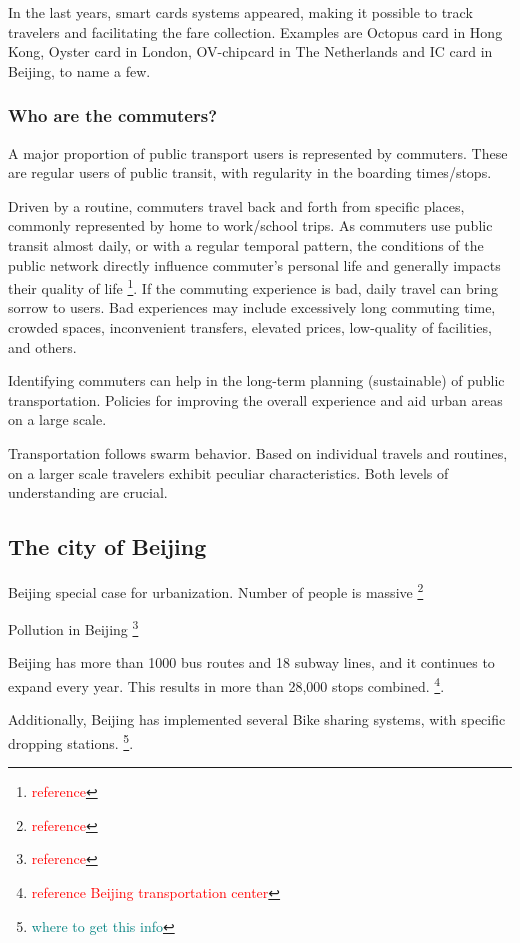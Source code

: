\documentclass{article}
\newcommand{\selfnote}[1]{\footnote{\textcolor{red}{#1}}}
\newcommand{\domainDoubt}[1]{\footnote{\textcolor{teal}{#1}}}
\begin{document}
In the last years, smart cards systems appeared, making it possible to track travelers and facilitating the fare collection. Examples are Octopus card in Hong Kong, Oyster card in London, OV-chipcard in The Netherlands and IC card in Beijing, to name a few.


\subsubsection{Who are the commuters?}
A major proportion of public transport users is represented by commuters. These are regular users of public transit, with regularity in the boarding times/stops. 

Driven by a routine, commuters travel back and forth from specific places, commonly represented by home to work/school trips. As commuters use public transit almost daily, or with a regular temporal pattern, the  conditions of the public network directly influence commuter's personal life and generally impacts their quality of life \selfnote{reference}. If the commuting experience is bad, daily travel can bring sorrow to users. Bad experiences may include excessively long commuting time, crowded spaces, inconvenient transfers, elevated prices, low-quality of facilities, and others. 

Identifying commuters can help in the long-term planning (sustainable) of public transportation. Policies for improving the overall experience and aid urban areas on a large scale.

Transportation follows swarm behavior. Based on individual travels and routines, on a larger scale travelers exhibit peculiar characteristics. Both levels of understanding are crucial.   

\subsection{The city of Beijing}
Beijing special case for urbanization. Number of people is massive \selfnote{reference}

Pollution in Beijing \selfnote{reference}

Beijing has more than 1000 bus routes and 18 subway lines, and it continues to expand every year. This results in more than 28,000 stops combined. \selfnote{reference Beijing transportation center}. 

Additionally, Beijing has implemented several Bike sharing systems, with specific dropping stations. \domainDoubt{where to get this info}.
\end{document}
